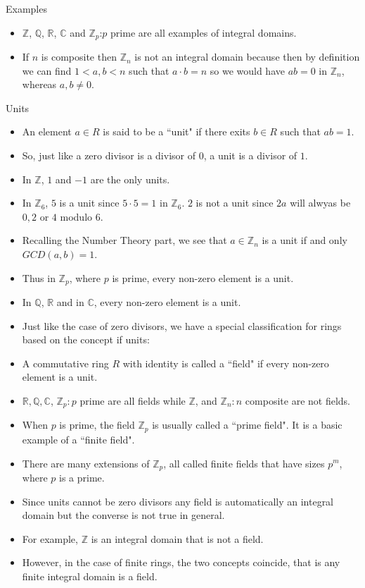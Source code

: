 \documentclass[ %
 10pt, xcolor={dvipsnames,svgnames,x11names,hyperref},
   hyperref={colorlinks=true,citecolor=green,linkcolor=DarkRed,urlcolor=ProcessBlue,anchorcolor=blue}
  ]{beamer}
\newenvironment{stepitemize}{\begin{itemize}[<+->]}{\end{itemize} }
\newcommand{\Z}{\mathbb{Z}}
\newcommand{\Q}{\mathbb{Q}}
\newcommand{\R}{\mathbb{R}}
\newcommand{\C}{\mathbb{C}}
\begin{document}
\begin{frame}{Examples}
\begin{stepitemize}
\item $\Z$, $\Q$, $\R$, $\C$ and $\Z_p$:$p$ prime
 are all examples of integral domains.
 \item If $n$ is composite then $\Z_n$ is not an integral domain because then by definition we can find $1<a,b<n$ such that $a\cdot b=n$ so we would have $ab=0$ in $\Z_n$, whereas $a, b\neq 0$.
\end{stepitemize}

\end{frame}
\begin{frame}{Units}
\begin{stepitemize}
\item An element $a\in R$ is said to be a ``unit" if there exits $b\in R$ such that $ab=1$.
\item So,  just like a zero divisor is a divisor of $0$, a unit is a divisor of $1$.
\item In $\Z$, $1$ and $-1$ are the only units.
    \item In $\Z_6$, $5$ is a unit since $5\cdot 5 =1$ in $\Z_6$. $2$ is not a unit since $2a$ will alwyas be $0,2$ or $4$ modulo $6$.
    \item Recalling the Number Theory part, we see that $a\in \Z_n$ is a unit if and only $GCD(a,b)=1$.
    \item Thus in $\Z_p$, where $p$ is prime, every non-zero element is a unit.
    \item In $\Q$, $\R$ and in $\C$, every non-zero element is a unit.
\end{stepitemize}
    \end{frame}
\begin{frame}{}
    \begin{stepitemize}
    \item Just like the case of zero divisors, we have a special classification for rings based on the concept if units:
\item A commutative ring $R$ with identity is called a ``field" if every non-zero element is a unit.
\item
$\R, \Q, \C$, $\Z_p:p$ prime are all fields while $\Z$, and $\Z_n:n$ composite are not fields.
\item When $p$ is prime, the field $\Z_p$ is usually called a ``prime field". It is a basic example of a ``finite field". \item There are many extensions of $\Z_p$, all called finite fields that have sizes $p^m$, where $p$ is a prime.

\item Since units cannot be zero divisors any field is automatically an integral domain but the converse is not true in general.
\item For example, $\Z$ is an integral domain that is not a field.
\item However, in the case of finite rings, the two concepts coincide, that is any finite integral domain is a field.
    \end{stepitemize}
\end{frame}
\end{document}
